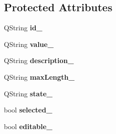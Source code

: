 \subsection*{Protected Attributes}
\begin{DoxyCompactItemize}
\item 
\mbox{\label{classString_a57119b0e8878311777ccf94ea542f745}} 
Q\+String {\bfseries id\+\_\+}
\item 
\mbox{\label{classString_a4168491f40c415cd410fbab1cccfc523}} 
Q\+String {\bfseries value\+\_\+}
\item 
\mbox{\label{classString_a87cbb04e3c7fd009a4323e95d39cfd1e}} 
Q\+String {\bfseries description\+\_\+}
\item 
\mbox{\label{classString_a8463d3d3d595bc50b4f37908f4e6aa74}} 
Q\+String {\bfseries max\+Length\+\_\+}
\item 
\mbox{\label{classString_acb000d4634c91cdffcc89e44c534c008}} 
Q\+String {\bfseries state\+\_\+}
\item 
\mbox{\label{classString_a2c7623a98c3bec1ae8658952dca0b1bf}} 
bool {\bfseries selected\+\_\+}
\item 
\mbox{\label{classString_ac8f7b0d152b7aaedb6eadb2c15ed23b5}} 
bool {\bfseries editable\+\_\+}
\end{DoxyCompactItemize}
